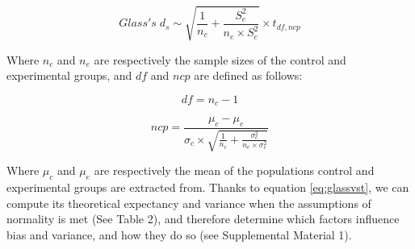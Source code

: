 \documentclass[
  man,floatsintext]{apa6}
\begin{document}
\begin{equation} 
Glass's \; d_s \sim \sqrt{\frac{1}{n_{c}}+\frac{S_{e}^2}{n_{e} \times S^2_{c}}} \times t_{df,ncp}
\label{eq:glassvst}
\end{equation}

Where \(n_c\) and \(n_e\) are respectively the sample sizes of the control and experimental groups, and \(df\) and \(ncp\) are defined as follows:

\begin{equation} 
df = n_{c}-1
\label{eq:glassdf}
\end{equation}

\begin{equation} 
ncp = \frac{\mu_{c}-\mu_{e}}{\sigma_{c} \times \sqrt{\frac{1}{n_{c}} + \frac{\sigma_{e}^2}{n_{e} \times \sigma^2_{c}}}}
\label{eq:glassdf}
\end{equation}

Where \(\mu_c\) and \(\mu_e\) are respectively the mean of the populations control and experimental groups are extracted from. Thanks to equation \ref{eq:glassvst}, we can compute its theoretical expectancy and variance when the assumptions of normality is met (See Table 2), and therefore determine which factors influence bias and variance, and how they do so (see Supplemental Material 1).
\end{document}
